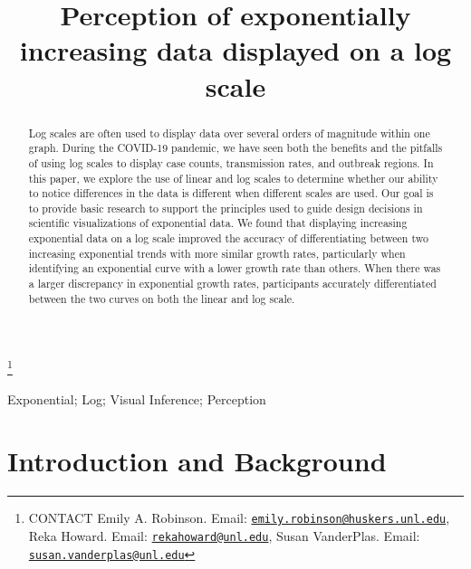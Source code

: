 \documentclass[]{interact}
\theoremstyle{plain}%
\theoremstyle{definition}
\theoremstyle{remark}
\begin{document}

\title{Perception of exponentially increasing data displayed on a log scale}


\author{
}

\thanks{CONTACT Emily A. Robinson. Email: \href{mailto:emily.robinson@huskers.unl.edu}{\nolinkurl{emily.robinson@huskers.unl.edu}}, Reka Howard. Email: \href{mailto:rekahoward@unl.edu}{\nolinkurl{rekahoward@unl.edu}}, Susan VanderPlas. Email: \href{mailto:susan.vanderplas@unl.edu}{\nolinkurl{susan.vanderplas@unl.edu}}}

\maketitle

\begin{abstract}
Log scales are often used to display data over several orders of
magnitude within one graph. During the COVID-19 pandemic, we have seen
both the benefits and the pitfalls of using log scales to display case
counts, transmission rates, and outbreak regions. In this paper, we
explore the use of linear and log scales to determine whether our
ability to notice differences in the data is different when different
scales are used. Our goal is to provide basic research to support the
principles used to guide design decisions in scientific visualizations
of exponential data. We found that displaying increasing exponential
data on a log scale improved the accuracy of differentiating between two
increasing exponential trends with more similar growth rates,
particularly when identifying an exponential curve with a lower growth
rate than others. When there was a larger discrepancy in exponential
growth rates, participants accurately differentiated between the two
curves on both the linear and log scale.
\end{abstract}

\begin{keywords}
Exponential; Log; Visual Inference; Perception
\end{keywords}

\hypertarget{introduction-and-background}{%
\section{Introduction and
Background}\label{introduction-and-background}}
\end{document}
